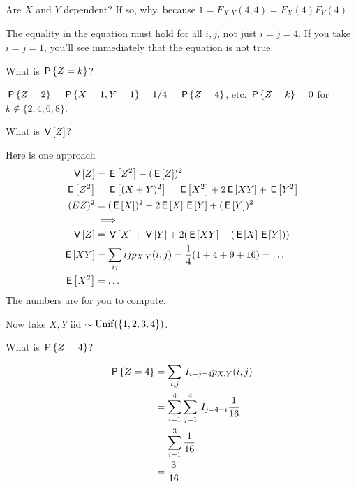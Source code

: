 \begin{exercise}
Are $X$ and $Y$ dependent?  If so, why, because $1=F_{X,Y}(4,4)= F_X(4)F_Y(4)$
\begin{solution}
  The equality in the equation must hold for all $i,j$, not just $i=j=4$.
  If you take $i=j=1$, you'll see immediately that the equation is not true.
\end{solution}
\end{exercise}

\begin{exercise}
What is $\P{Z=k}$?
\begin{solution}
$\P{Z=2} = \P{X=1, Y=1} = 1/4 = \P{Z=4}$, etc.
$\P{Z=k} = 0$ for $k\not \in \{2, 4, 6, 8\}$.
\end{solution}
\end{exercise}


\begin{exercise}
What is $\V Z$?
\begin{solution}
Here is one approach
\begin{align}
\label{eq:3}
\V Z &= \E{Z^2} - (\E Z)^{2}\\
\E{Z^2} &= \E{(X+Y)^{2}} = \E{X^{2}} + 2\E{XY} + \E{Y^{2}} \\
(E{Z})^{2} &= (\E X)^2 + 2\E X \E Y + (\E Y)^{2} \\
&\implies \\
\V Z &= \V X + \V Y + 2 (\E{XY} - (\E X \E Y))\\
\E{XY} &= \sum_{ij} ijp_{X,Y}(i,j) = \frac 1 4 (1 + 4 + 9 + 16) = \ldots \\
\E{X^{2}} &= \ldots
\end{align}
The numbers are for you to compute.
\end{solution}
\end{exercise}


Now take $X, Y$ iid $\sim\Unif{\{1,2,3,4\}}$.

\begin{exercise}
What is $\P{Z=4}$?
\begin{solution}
\begin{align}
\label{eq:2}
\P{Z=4}
&= \sum_{i, j} \1{i+j=4} p_{X,Y}(i,j) \\
&= \sum_{i=1}^4 \sum_{j=1}^{4} \1{j=4-i} \frac{1}{16} \\
&= \sum_{i=1}^3  \frac{1}{16} \\
&= \frac{3}{16}.
\end{align}
\end{solution}
\end{exercise}

